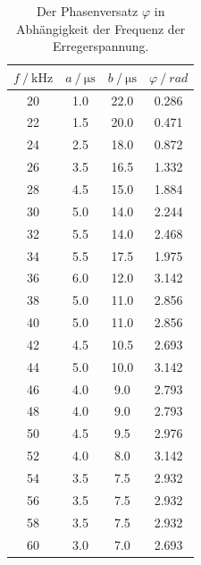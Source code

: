 \begin{table}[H]
  \centering
  \caption{Der Phasenversatz $\varphi$ in Abhängigkeit der Frequenz der Erregerspannung.}
  \begin{tabular}{cccc}
    \toprule
    {$f \mathbin{/} \unit{\kilo\hertz}$} &
    {$a \mathbin{/} \unit{\micro\second}$} &
    {$b \mathbin{/} \unit{\micro\second}$} &
    {$\varphi \mathbin{/} rad$} \\
    \midrule
    
    20 & 1.0 & 22.0 & 0.286 \\
    22 & 1.5 & 20.0 & 0.471 \\
    24 & 2.5 & 18.0 & 0.872 \\
    26 & 3.5 & 16.5 & 1.332 \\
    28 & 4.5 & 15.0 & 1.884 \\
    30 & 5.0 & 14.0 & 2.244 \\
    32 & 5.5 & 14.0 & 2.468 \\
    34 & 5.5 & 17.5 & 1.975 \\
    36 & 6.0 & 12.0 & 3.142 \\
    38 & 5.0 & 11.0 & 2.856 \\
    40 & 5.0 & 11.0 & 2.856 \\
    42 & 4.5 & 10.5 & 2.693 \\
    44 & 5.0 & 10.0 & 3.142 \\
    46 & 4.0 & 9.0  &  2.793 \\
    48 & 4.0 & 9.0  &  2.793 \\
    50 & 4.5 & 9.5  &  2.976 \\
    52 & 4.0 & 8.0  &  3.142 \\
    54 & 3.5 & 7.5  &  2.932 \\
    56 & 3.5 & 7.5  &  2.932 \\
    58 & 3.5 & 7.5  &  2.932 \\
    60 & 3.0 & 7.0  &  2.693 \\
    
    \bottomrule
  \end{tabular}
  \label{tab:Tabelle2}
\end{table}



